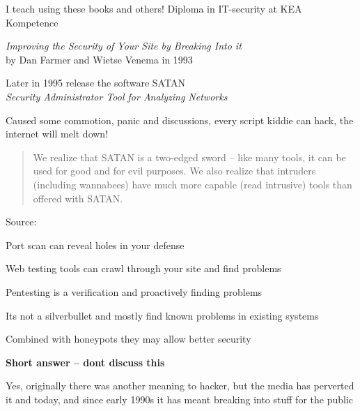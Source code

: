 \documentclass[Screen16to9,17pt]{foils}
\begin{document}
I teach using these books and others! Diploma in IT-security at KEA Kompetence\\





\begin{list1}
\item \emph{Improving the Security of Your Site by Breaking Into it}\\ by
Dan Farmer and Wietse Venema in 1993
\item Later in 1995 release the software SATAN\\
\emph{Security Administrator Tool for Analyzing Networks}
\item Caused some commotion, panic and discussions, every script kiddie can hack, the internet will melt down!
\vskip 5mm
\begin{quote}
We realize that SATAN is a two-edged sword -- like
many tools, it can be used for good and for evil
purposes. We also realize that intruders (including
wannabees) have much more capable (read intrusive)
tools than offered with SATAN.
\end{quote}
\end{list1}

\vskip 1cm
Source:



\begin{list1}
\item Port scan can reveal holes in your defense
\item Web testing tools can crawl through your site and find problems
\item Pentesting is a verification and proactively finding problems
\item Its not a silverbullet and mostly find known problems in existing systems
\item Combined with honeypots they may allow better security
\end{list1}



{\bfseries Short answer -- dont discuss this}

Yes, originally there was another meaning to hacker, but the media has perverted it and today, and since early 1990s it has meant breaking into stuff for the public
\end{document}
